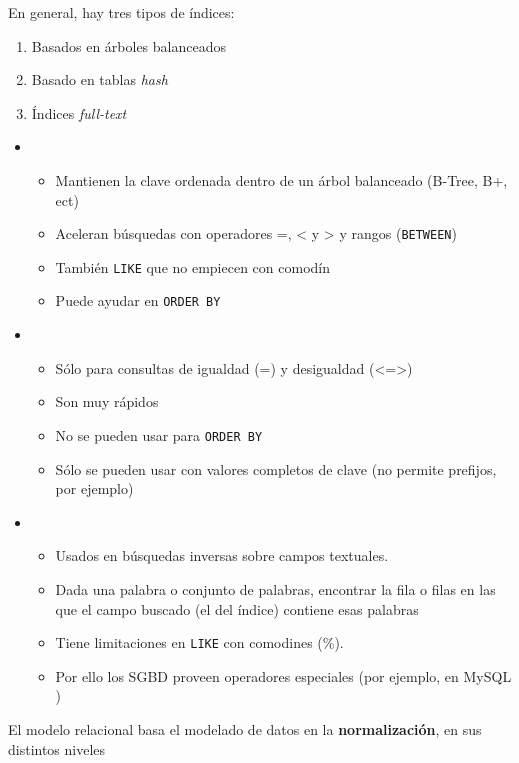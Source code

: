 En general, hay tres tipos de índices:
\begin{enumerate}[label=\arabic*)]
	\item Basados en árboles balanceados
	\item Basado en tablas \textit{hash}
	\item Índices \textit{full-text}
\end{enumerate}
\begin{itemize}[label=\color{red}\textbullet, leftmargin=*]
	\item {}
	\begin{itemize}
		\item Mantienen la clave ordenada dentro de un árbol balanceado (B-Tree, B+, ect)
		\item Aceleran búsquedas con operadores =, < y > y rangos (\texttt{BETWEEN})
		\item También \texttt{LIKE} que no empiecen con comodín
		\item Puede ayudar en \texttt{ORDER BY}
	\end{itemize}
	\item {}
	\begin{itemize}
		\item Sólo para consultas de igualdad (=) y desigualdad (<=>)
		\item Son muy rápidos
		\item No se pueden usar para \texttt{ORDER BY}
		\item Sólo se pueden usar con valores completos de clave (no permite prefijos, por ejemplo)
	\end{itemize}
	\item {}
	\begin{itemize}
		\item Usados en búsquedas inversas sobre campos textuales.
		\item Dada una palabra o conjunto de palabras, encontrar la fila o filas en las que el campo buscado (el del índice) contiene esas palabras
		\item Tiene limitaciones en \texttt{LIKE} con comodines (\%).
		\item Por ello los SGBD proveen operadores especiales (por ejemplo, en MySQL )
	\end{itemize}
\end{itemize}
El modelo relacional basa el modelado de datos en la \textbf{normalización}, en sus distintos niveles

